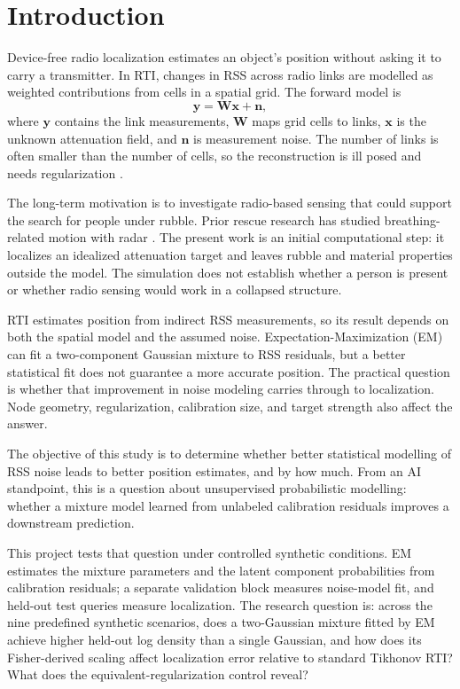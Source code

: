 \documentclass[sensors,article,submit,oneauthor]{Definitions/mdpi}
\begin{document}

\section{Introduction}

Device-free radio localization estimates an object's position without asking it to carry a transmitter. In RTI, changes in RSS across radio links are modelled as weighted contributions from cells in a spatial grid. The forward model is
\begin{equation}
\mathbf{y} = \mathbf{W}\mathbf{x} + \mathbf{n},
\end{equation}
where $\mathbf{y}$ contains the link measurements, $\mathbf{W}$ maps grid cells to links, $\mathbf{x}$ is the unknown attenuation field, and $\mathbf{n}$ is measurement noise. The number of links is often smaller than the number of cells, so the reconstruction is ill posed and needs regularization \cite{Wilson2010}.

The long-term motivation is to investigate radio-based sensing that could support the search for people under rubble. Prior rescue research has studied breathing-related motion with radar \cite{Takeuchi2008}. The present work is an initial computational step: it localizes an idealized attenuation target and leaves rubble and material properties outside the model. The simulation does not establish whether a person is present or whether radio sensing would work in a collapsed structure.

RTI estimates position from indirect RSS measurements, so its result depends on both the spatial model and the assumed noise. Expectation-Maximization (EM) can fit a two-component Gaussian mixture to RSS residuals, but a better statistical fit does not guarantee a more accurate position. The practical question is whether that improvement in noise modeling carries through to localization. Node geometry, regularization, calibration size, and target strength also affect the answer.

The objective of this study is to determine whether better statistical modelling of RSS noise leads to better position estimates, and by how much. From an AI standpoint, this is a question about unsupervised probabilistic modelling: whether a mixture model learned from unlabeled calibration residuals improves a downstream prediction.

This project tests that question under controlled synthetic conditions. EM estimates the mixture parameters and the latent component probabilities from calibration residuals; a separate validation block measures noise-model fit, and held-out test queries measure localization. The research question is: across the nine predefined synthetic scenarios, does a two-Gaussian mixture fitted by EM achieve higher held-out log density than a single Gaussian, and how does its Fisher-derived scaling affect localization error relative to standard Tikhonov RTI? What does the equivalent-regularization control reveal?
\end{document}
